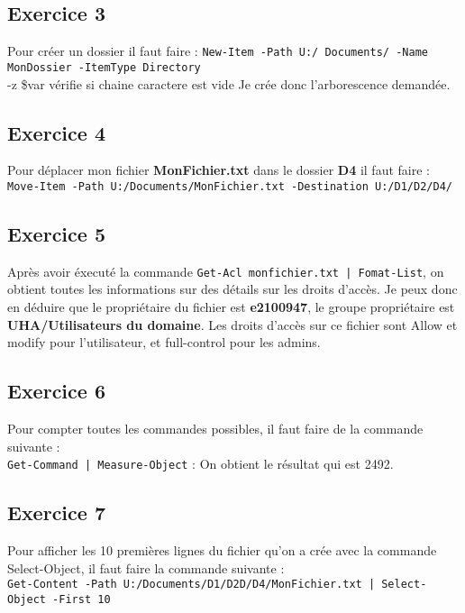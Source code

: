 \documentclass[12pt, a4paper]{article}
\begin{document}
\subsection{Exercice 3}
Pour créer un dossier il faut faire : 
\texttt{New-Item -Path U:/ Documents/ -Name MonDossier -ItemType Directory}\\
-z \$var vérifie si chaine caractere est vide 
Je crée donc l'arborescence demandée. 

\newpage
\subsection{Exercice 4}
Pour déplacer mon fichier \textbf{MonFichier.txt} dans le dossier \textbf{D4} il faut faire :\\

\texttt{Move-Item -Path U:/Documents/MonFichier.txt -Destination U:/D1/D2/D4/}\\

\subsection{Exercice 5}
Après avoir éxecuté la commande \texttt{Get-Acl monfichier.txt | Fomat-List}, 
on obtient toutes les informations sur des détails sur les droits d'accès. Je 
peux donc en déduire que le propriétaire du fichier est \textbf{e2100947}, le groupe
propriétaire est \textbf{UHA/Utilisateurs du domaine}. Les droits d'accès sur 
ce fichier sont Allow et modify pour l'utilisateur, et full-control pour les admins. 

\subsection{Exercice 6}
Pour compter toutes les commandes possibles, il faut faire de la commande suivante :\\

\texttt{Get-Command | Measure-Object} : On obtient le résultat qui est 2492.\\

\subsection{Exercice 7}
Pour afficher les 10 premières lignes du fichier qu'on a crée avec la commande 
Select-Object, il faut faire la commande suivante :\\

\texttt{Get-Content -Path U:/Documents/D1/D2D/D4/MonFichier.txt | Select-Object -First 10}\\
\end{document}
